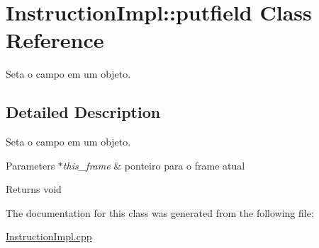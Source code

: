 \hypertarget{class_instruction_impl_1_1putfield}{}\section{Instruction\+Impl\+:\+:putfield Class Reference}
\label{class_instruction_impl_1_1putfield}


Seta o campo em um objeto.  




\subsection{Detailed Description}
Seta o campo em um objeto. 


\begin{DoxyParams}{Parameters}
{\em $\ast$this\+\_\+frame} & ponteiro para o frame atual \\
\hline
\end{DoxyParams}
\begin{DoxyReturn}{Returns}
void 
\end{DoxyReturn}


The documentation for this class was generated from the following file\+:\begin{DoxyCompactItemize}
\item 
\hyperlink{_instruction_impl_8cpp}{Instruction\+Impl.\+cpp}\end{DoxyCompactItemize}
